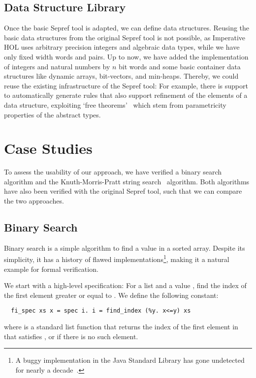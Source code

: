 \documentclass[a4paper,USenglish,cleveref, autoref]{lipics-v2019}
\begin{document}
\subsection{Data Structure Library}
Once the basic Sepref tool is adapted, we can define data structures. 
Reusing the basic data structures from the original Sepref tool is not possible, as Imperative HOL 
uses arbitrary precision integers and algebraic data types, while we have only fixed width words and pairs.
Up to now, we have added the implementation of integers and natural numbers 
by $n$ bit words and some basic container data structures like dynamic arrays, bit-vectors, and min-heaps.
Thereby, we could reuse the existing infrastructure of the Sepref tool: For example,
there is support to automatically generate rules that also support refinement of the elements of a data structure, 
exploiting `free theorems'~\cite{Wad89} which stem from parametricity properties of the abstract types.

\section{Case Studies}\label{sec:casestudies}
To assess the usability of our approach, we have verified a binary search algorithm and 
the Knuth-Morris-Pratt string search~\cite{KMP77} algorithm. 
Both algorithms have also been verified with the original Sepref tool, such that we can compare the two approaches.

\subsection{Binary Search}
Binary search is a simple algorithm to find a value in a sorted array. 
Despite its simplicity, it has a history of flawed implementations\footnote{A buggy implementation in the Java Standard Library has gone undetected for nearly a decade~\cite{bs_flaw_blogpost}.}, making it a natural example for formal verification.

We start with a high-level specification: For a list  and a value , find the index of the first element greater or equal to .
We define the following constant:
\begin{lstlisting}
  fi_spec xs x = spec i. i = find_index (%y. x<=y) xs
\end{lstlisting}
where  is a standard list function that returns the index of the 
first element in  that satisfies , or  if there is no such element.
\end{document}

